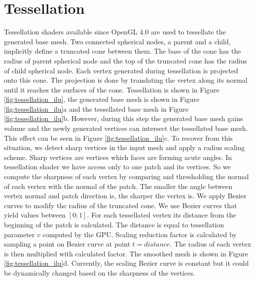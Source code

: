 \section{Tessellation}
Tessellation shaders available since OpenGL 4.0 are used to tessellate the generated base mesh.
Two connected spherical nodes, a parent and a child, implicitly define a truncated cone between them.
The base of the cone has the radius of parent spherical node and the top of the truncated cone has the radius of child spherical node.
Each vertex generated during tessellation is projected onto this cone.
The projection is done by translating the vertex along its normal until it reaches the surfaces of the cone.
Tessellation is shown in Figure \ref{fig:tessellation_ilu}, the generated base mesh is shown in Figure \ref{fig:tessellation_ilu}a and the tessellated base mesh in Figure \ref{fig:tessellation_ilu}b.
However, during this step the generated base mesh gains volume and the newly generated vertices can intersect the tessellated base mesh.
This effect can be seen in Figure \ref{fig:tessellation_ilu}c.
To recover from this situation, we detect sharp vertices in the input mesh and apply a radius scaling scheme.
Sharp vertices are vertices which faces are forming acute angles.
In tessellation shader we have access only to one patch and its vertices.
So we compute the sharpness of each vertex by comparing and thresholding the normal of each vertex with the normal of the patch.
The smaller the angle between vertex normal and patch direction is, the sharper the vertex is.
We apply Bezier curves to modify the radius of the truncated cone.
We use Bezier curves that yield values between $[0;1]$.
For each tessellated vertex its distance from the beginning of the patch is calculated.
The distance is equal to tessellation parameter $v$ computed by the GPU.
Scaling reduction factor is calculated by sampling a point on Bezier curve at point $t = distance$.
The radius of each vertex is then multiplied with calculated factor.
The smoothed mesh is shown in Figure \ref{fig:tessellation_ilu}d.
Currently, the scaling Bezier curve is constant but it could be dynamically changed based on the sharpness of the vertices.

